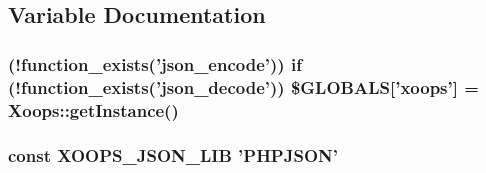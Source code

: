 \subsection{Variable Documentation}
\hypertarget{rest__json_8php_ab990bf70b4d23779b5e44c6ad5cbdf5d}{
\subsubsection[{\$\-G\-L\-O\-B\-A\-L\-S}]{ (!function\-\_\-exists('json\-\_\-encode')) {\bf if} (!function\-\_\-exists('json\-\_\-decode')) \$G\-L\-O\-B\-A\-L\-S\mbox{[}'xoops'\mbox{]} = Xoops\-::get\-Instance()}}\label{rest__json_8php_ab990bf70b4d23779b5e44c6ad5cbdf5d}
\hypertarget{rest__json_8php_a42fbc26b113afc08a5757bacf456cd8a}{
\subsubsection[{X\-O\-O\-P\-S\-\_\-\-J\-S\-O\-N\-\_\-\-L\-I\-B}]{\setlength{\rightskip}{0pt plus 5cm}const X\-O\-O\-P\-S\-\_\-\-J\-S\-O\-N\-\_\-\-L\-I\-B 'P\-H\-P\-J\-S\-O\-N'}}\label{rest__json_8php_a42fbc26b113afc08a5757bacf456cd8a}
